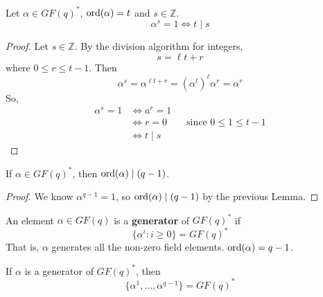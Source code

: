 \begin{thmbox}
    \begin{lemma}
        Let $ \alpha\in GF(q)^* $, $ \operatorname{ord}(\alpha)=t $ and $ s\in\mathbb{Z} $.
        \[ \alpha^s=1\iff t\mid s \]
    \end{lemma}
\end{thmbox}

\begin{proof}
    Let $ s\in\mathbb{Z} $. By the division algorithm for integers,
    \[ s=\ell t+r \]
    where $ 0\leqslant r\leqslant t-1 $. Then
    \[ \alpha^s=\alpha^{\ell t+r}=(\alpha^t)^\ell \alpha^r=\alpha^r \]
    So,
    \begin{align*}
        \alpha^s=1 & \iff a^r=1                                             \\
                   & \iff r=0 \qquad\text{since } 0\leqslant 1\leqslant t-1 \\
                   & \iff t\mid s
    \end{align*}
\end{proof}

\begin{thmbox}
    \begin{corollary}
        If $ \alpha\in GF(q)^* $, then $ \operatorname{ord}(\alpha)\mid (q-1) $.
    \end{corollary}
\end{thmbox}

\begin{proof}
    We know $ \alpha^{q-1}=1 $, so $ \operatorname{ord}(\alpha)\mid (q-1) $ by
    the previous Lemma.
\end{proof}

\begin{defbox}
    \begin{definition}
        An element $ \alpha\in GF(q) $ is a \textbf{generator} of
        $ GF(q)^* $ if
        \[ \{\alpha^i:i\geqslant 0\}=GF(q)^* \]
        That is, $ \alpha $ generates all the non-zero field elements.
        $ \operatorname{ord}(\alpha)=q-1 $.
    \end{definition}
\end{defbox}

\begin{thmbox}
    \begin{theorem}
        If $ \alpha $ is a generator of $ GF(q)^* $, then
        \[ \{\alpha^1,\ldots ,\alpha^{q-1}\}=GF(q)^* \]
    \end{theorem}
\end{thmbox}

